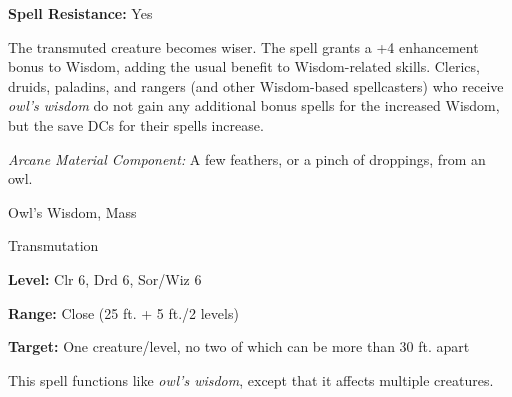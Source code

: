 \documentclass{article}
\begin{document}
\textbf{Spell Resistance:} Yes

The transmuted creature becomes wiser. The spell grants a +4 enhancement bonus 
to Wisdom, adding the usual benefit to Wisdom-related skills. Clerics, druids, 
paladins, and rangers (and other Wisdom-based spellcasters) who receive \textit{owl's 
wisdom }do not gain any additional bonus spells for the increased Wisdom, but the 
save DCs for their spells increase.

\textit{Arcane Material Component: }A few feathers, or a pinch of droppings, from 
an owl.

\vspace{12pt}
Owl's Wisdom, Mass

Transmutation

\textbf{Level:} Clr 6, Drd 6, Sor/Wiz 6

\textbf{Range:} Close (25 ft. + 5 ft./2 levels)

\textbf{Target:} One creature/level, no two of which can be more than 30 ft. apart

This spell functions like \textit{owl's wisdom}, except that it affects multiple 
creatures.

\newpage
\end{document}
